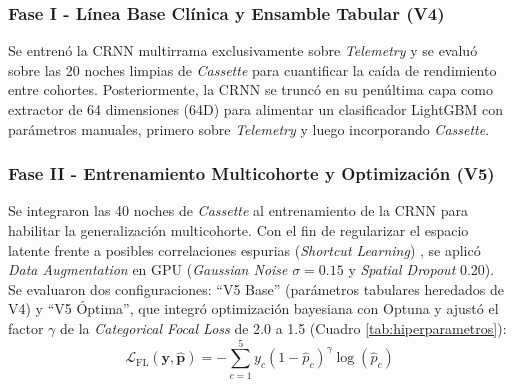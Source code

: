 \documentclass[conference]{IEEEtran}
\begin{document}
\subsubsection{Fase I - Línea Base Clínica y Ensamble Tabular (V4)}
Se entrenó la CRNN multirrama exclusivamente sobre \textit{Telemetry} y se evaluó sobre las 20 noches limpias de \textit{Cassette} para cuantificar la caída de rendimiento entre cohortes. Posteriormente, la CRNN se truncó en su penúltima capa como extractor de 64 dimensiones (64D) para alimentar un clasificador LightGBM \cite{ke2017} con parámetros manuales, primero sobre \textit{Telemetry} y luego incorporando \textit{Cassette}.

\subsubsection{Fase II - Entrenamiento Multicohorte y Optimización (V5)}
Se integraron las 40 noches de \textit{Cassette} al entrenamiento de la CRNN para habilitar la generalización multicohorte. Con el fin de regularizar el espacio latente frente a posibles correlaciones espurias (\textit{Shortcut Learning}) \cite{geirhos2020shortcut}, se aplicó \textit{Data Augmentation} en GPU (\textit{Gaussian Noise} $\sigma=0.15$ y \textit{Spatial Dropout} 0.20). Se evaluaron dos configuraciones: ``V5 Base'' (parámetros tabulares heredados de V4) y ``V5 Óptima'', que integró optimización bayesiana con Optuna \cite{akiba2019optuna} y ajustó el factor $\gamma$ de la \textit{Categorical Focal Loss} \cite{lin2017} de 2.0 a 1.5 (Cuadro \ref{tab:hiperparametros}):
\begin{equation}
\mathcal{L}_{\text{FL}}(\mathbf{y}, \hat{\mathbf{p}}) = -\sum_{c=1}^{5} y_c (1 - \hat{p}_c)^{\gamma} \log(\hat{p}_c)
\label{eq:focal_loss}
\end{equation}

\begin{table}[htbp]
\centering
\caption{Resumen de Cambios en el Entrenamiento de la CRNN (246,053 Parámetros, LR=0.000125, Latente=64D, Dropout Max=0.4)}
\label{tab:hiperparametros}
\end{table}
\end{document}
